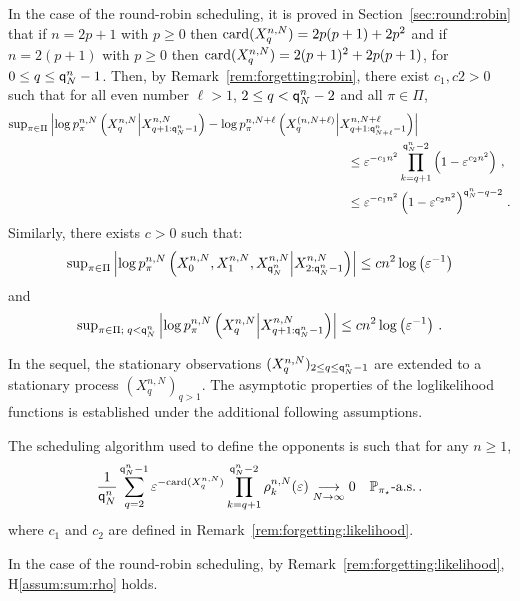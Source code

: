 \begin{remark}
\label{rem:forgetting:likelihood}
In the case of the round-robin scheduling, it is proved in Section~\ref{sec:round:robin} that if  $n = 2p+1$ with $p\ge 0$ then $\mathrm{card}(X^{n,N}_{q}) = 2p(p+1) + 2p^2$ and  if  $n = 2(p+1)$ with $p\ge 0$ then $\mathrm{card}(X^{n,N}_{q}) = 2(p+1)^2 + 2p(p+1)$, for $0 \le q\le {\mathsf{q}}^{n}_{N}-1$. Then, by Remark~\ref{rem:forgetting:robin}, there exist $c_1,c2 >0$ such that for all even number $\ell>1$,  $2\le q< {\mathsf{q}}^{n}_{N}-2$ and all $\pi\in\Pi$,
\begin{align*}
\sup_{\pi\in\Pi}\left|\log p_{\pi}^{n,N}\left(X_{q}^{n,N}\middle|X_{q+1:\ordermax{n}{N}-1}^{n,N}\right) - \log p_{\pi}^{n,N+\ell}\left(X_{q}^{(n,N+\ell)}\middle|X_{q+1:\ordermax{n}{N+\ell}-1}^{n,N+\ell}\right) \right|&\\
&\hspace{-2cm}\leq \varepsilon^{-c_1n^2}\prod_{k=q+1}^{\ordermax{n}{N}-2}\left(1-\varepsilon^{c_2n^2}\right) \eqsp,\\
&\hspace{-2cm}\leq \varepsilon^{-c_1n^2}\left(1-\varepsilon^{c_2n^2}\right)^{\ordermax{n}{N}-q-2}\eqsp.
\end{align*}
Similarly, there exists $c>0$ such that:
\[
\mathrm{sup}_{\pi\in\Pi}\left|\log p_{\pi}^{n,N}\left(X_{0}^{n,N},X_{1}^{n,N},X_{{\mathsf{q}}^{n}_{N}}^{n,N}\middle|X_{2:{\mathsf{q}}^{n}_{N}-1}^{n,N}\right)\right|\le cn^2\log \left(\varepsilon^{-1}\right)
\]
and 
\[
\mathrm{sup}_{\pi\in\Pi;\;q< {\mathsf{q}}^{n}_{N}}\left|\log p_{\pi}^{n,N}\left(X_{q}^{n,N}\middle|X_{q+1:{\mathsf{q}}^{n}_{N}-1}^{n,N}\right)\right|\le cn^2\log \left(\varepsilon^{-1}\right)\,.
\]
\end{remark}
In the sequel, the stationary observations $(X^{n,N}_{q})_{2\le q\le {\mathsf{q}}^{n}_{N}-1}$ are extended to a stationary process $(X^{n,N}_{q})_{ q>1}$. The asymptotic properties of the loglikelihood functions is established under the additional following assumptions.
\begin{hypH}
\label{assum:sum:rho}
The scheduling algorithm used to define the opponents is such that for any $n\ge 1$,
\[
 \frac{1}{{\mathsf{q}}^{n}_{N}}\sum_{q=2}^{{\mathsf{q}}^{n}_{N}-1}\varepsilon^{-\mathrm{card}(X^{n,N}_{q})}\prod_{k=q+1}^{{\mathsf{q}}^{n}_{N}-2}\rho^{n,N}_k(\varepsilon)\underset{N\to \infty}{\longrightarrow} 0\quad \mathbb{P}_{\pi_{\star}}\mbox{-a.s.}\,.
\]
where $c_1$ and $c_2$ are defined in Remark~\ref{rem:forgetting:likelihood}.
\end{hypH}
In the case of the round-robin scheduling, by Remark~\ref{rem:forgetting:likelihood}, H\ref{assum:sum:rho} holds. 

